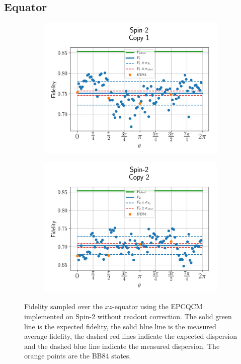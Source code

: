 \subsection{Equator}

\begin{figure}[H]
  \centering
  \begin{subfigure}{.5\textwidth}
    \centering
    \includegraphics[width=\textwidth]{Figures/Economical/Spin2/OnlyEquator/results_spin2_copy1.png}
    \label{fig:epc_uncorrected_spin2_equator_1}
  \end{subfigure}%
  \begin{subfigure}{.5\textwidth}
    \centering
    \includegraphics[width=\textwidth]{Figures/Economical/Spin2/OnlyEquator/results_spin2_copy2.png}
    \label{fig:epc_uncorrected_spin2_equator_2}
  \end{subfigure}
  \vspace{-0.5cm}
  \caption{Fidelity sampled over the $xz$-equator using the EPCQCM implemented on Spin-2 without readout correction.
  The solid green line is the expected fidelity, the solid blue line is the measured average fidelity, the dashed red lines indicate the expected dispersion and the dashed blue line indicate the measured dispersion. The orange points are the BB84 states.}
  \label{fig:epc_uncorrected_spin2_equator}
\end{figure}

